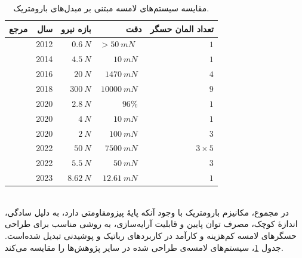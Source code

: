 \begin{table}[t]
	\centering
	\caption{مقایسه سیستم‌های لامسه  مبتنی بر مبدل‌های بارومتریک.}
	\label{tab:baro}
	\onehalfspacing
	\begin{tabular}{|r|r|r|r|r|}
		\hline
		\textbf{مرجع} & \textbf{سال}  & \textbf{بازه نیرو} & \textbf{دقت} & \textbf{تعداد المان حسگر} \\ \hline \hline
		\cite{zillich_versatile_2012} & 2012 &  $0.6 \: N$ & $> 50 \:mN$ \ & $1$ \\ \hline
		\cite{tenzer_feel_2014} & 2014 & $4.5 \: N $ & $ 10 \:mN $\ & $1$ \\ \hline
		\cite{reeks_angled_2016} & 2016 & $20 \: N $ & $ 1470 \:mN $\ & $4$ \\ \hline
		\cite{shayan_shrewdshoe_2018} & 2018 &  $300 \: N $ & $ 10000 \:mN $\ & $9$ \\ \hline
		\cite{koiva_barometer-based_2020} & 2020 &  $2.8 \: N $ & $ 96 \% $\ & $1$ \\ \hline
		\cite{hamed_design_2020} & 2020 & $4 \: N $ & $ 10 \: mN$\ & $1$ \\ \hline
		\cite{kim_artificial_2020} & 2020 & $2 \: N $ & $ 100 \: mN$\ & $3$ \\ \hline
		\cite{declercq_soft_2022} & 2022 & $50 \: N $ & $ 7500\: mN$\ & $3 \times 5$ \\ \hline
		\cite{kim_barotac_2022} & 2022 & $5.5 \: N $ & $ 50\: mN$\ & $3$ \\ \hline
		\cite{kim_experimental_2023} & 2023 & $8.62 \: N $ & $ 12.61\: mN$\ & $1$ \\ \hline
	\end{tabular}
	\end{table}
\\
در مجموع، مکانیزم بارومتریک با وجود آنکه پایهٔ پیزومقاومتی دارد، به دلیل سادگی، اندازهٔ کوچک، مصرف توان پایین و قابلیت آرایه‌سازی، به روشی مناسب برای طراحی حسگرهای لامسه کم‌هزینه و کارآمد در کاربردهای رباتیک و پوشیدنی تبدیل شده‌است. جدول \ref{tab:baro}، سیستم‌های لامسه‌ی طراحی شده در سایر پژوهش‌ها را مقایسه می‌کند.


